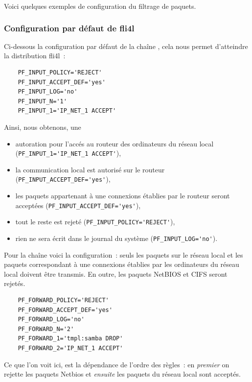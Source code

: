 Voici quelques exemples de configuration du filtrage de paquets.

\subsubsection{Configuration par défaut de fli4l}

Ci-dessous la configuration par défaut de la chaîne , cela
nous permet d'atteindre la distribution fli4l~:

\begin{example}
\begin{verbatim}
    PF_INPUT_POLICY='REJECT'
    PF_INPUT_ACCEPT_DEF='yes'
    PF_INPUT_LOG='no'
    PF_INPUT_N='1'
    PF_INPUT_1='IP_NET_1 ACCEPT'
\end{verbatim}
\end{example}

Ainsi, nous obtenons, une
\begin{itemize}
\item autoration pour l'accés au routeur des ordinateurs du réseau local
  (\verb+PF_INPUT_1='IP_NET_1 ACCEPT'+),
\item la communication local est autorisé sur le routeur
  (\verb+PF_INPUT_ACCEPT_DEF='yes'+),
\item les paquets appartenant à une connexions établies par le routeur seront
  acceptées \newline (\verb+PF_INPUT_ACCEPT_DEF='yes'+),
\item tout le reste est rejeté (\verb+PF_INPUT_POLICY='REJECT'+),
\item rien ne sera écrit dans le journal du système
  (\verb+PF_INPUT_LOG='no'+).
\end{itemize}

Pour la chaîne  voici la configuration~: seuls les paquets
sur le réseau local et les paquets correspondant à une connexions établies par
les ordinateurs du réseau local doivent être transmis. En outre, les paquets
NetBIOS et CIFS seront rejetés.

\begin{example}
\begin{verbatim}
    PF_FORWARD_POLICY='REJECT'
    PF_FORWARD_ACCEPT_DEF='yes'
    PF_FORWARD_LOG='no'
    PF_FORWARD_N='2'
    PF_FORWARD_1='tmpl:samba DROP'
    PF_FORWARD_2='IP_NET_1 ACCEPT'
\end{verbatim}
\end{example}

Ce que l'on voit ici, est la dépendance de l'ordre des règles~: en \emph{premier}
on rejette les paquets Netbios et \emph{ensuite} les paquets du réseau local
sont acceptés.

